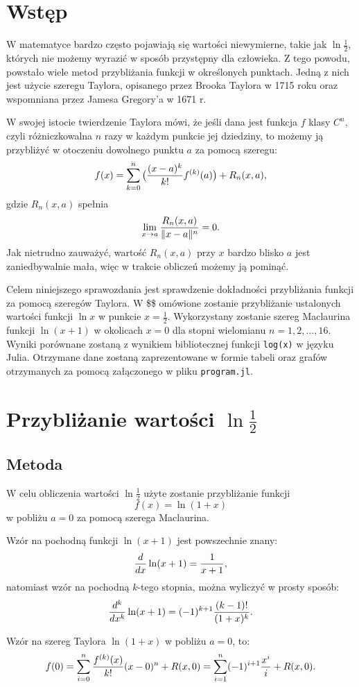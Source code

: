 \documentclass[11pt, wide, leqno]{mwart}
\begin{document}
\maketitle
\tableofcontents

\section{Wstęp}

W matematyce bardzo często pojawiają się wartości niewymierne, takie jak $\ln \frac12$, których nie możemy wyrazić w sposób przystępny dla człowieka. Z tego powodu, powstało wiele metod przybliżania funkcji w określonych punktach. Jedną z nich jest użycie szeregu Taylora, opisanego przez Brooka Taylora w 1715 roku oraz wspomniana przez Jamesa Gregory'a w 1671 r.

W swojej istocie twierdzenie Taylora mówi, że jeśli dana jest funkcja $f$ klasy $C^n$, czyli różniczkowalna $n$ razy w każdym punkcie jej dziedziny, to możemy ją przybliżyć w otoczeniu dowolnego punktu $a$ za pomocą szeregu:
$$f(x)=\sum\limits_{k=0}^n\big({(x-a)^k\over k!} f^{(k)}(a)\big)+R_n(x, a),$$
gdzie $R_n(x, a)$ spełnia
$$\lim\limits_{x\to a}{R_n(x,a)\over\|x-a\|^n}=0.$$
Jak nietrudno zauważyć, wartość $R_n(x, a)$ przy $x$ bardzo blisko $a$ jest zaniedbywalnie mała, więc w trakcie obliczeń możemy ją pominąć.

Celem niniejszego sprawozdania jest sprawdzenie dokładności przybliżania funkcji za pomocą szeregów Taylora. W \$\$ omówione zostanie przybliżanie ustalonych wartości funkcji $\ln x$ w punkcie $x=\frac12$. Wykorzystany zostanie szereg Maclaurina funkcji $\ln(x+1)$ w okolicach $x=0$ dla stopni wielomianu $n=1, 2, ..., 16$. Wyniki porównane zostaną z wynikiem bibliotecznej funkcji \verb+log(x)+ w języku Julia. Otrzymane dane zostaną zaprezentowane w formie tabeli oraz grafów otrzymanych za pomocą załączonego w pliku \verb+program.jl+.

\section{Przybliżanie wartości $\ln\frac12$}

\subsection{Metoda}

W celu obliczenia wartości $\ln\frac12$ użyte zostanie przybliżanie funkcji
$$f(x)=\ln (1+x)$$
w pobliżu $a=0$ za pomocą szerega Maclaurina.

Wzór na pochodną funkcji $\ln (x+1)$ jest powszechnie znany:
$${d\over dx}\ln (x+1)=\frac1{x+1},$$
natomiast wzór na pochodną $k$-tego stopnia, można wyliczyć w prosty sposób:
\begin{align}
    {d^k\over dx^k}\ln (x+1)=(-1)^{k+1}{(k-1)!\over(1+x)^{k}}.
\end{align}

Wzór na szereg Taylora $\ln (1+x)$ w pobliżu $a=0$, to:
$$f(0)=\sum\limits_{i=0}^n{f^{(k)}(x)\over k!}(x-0)^n + R(x, 0)=\sum\limits_{i=1}^n(-1)^{i+1}{x^i\over i}+R(x, 0).$$



\koniec
\end{document}
